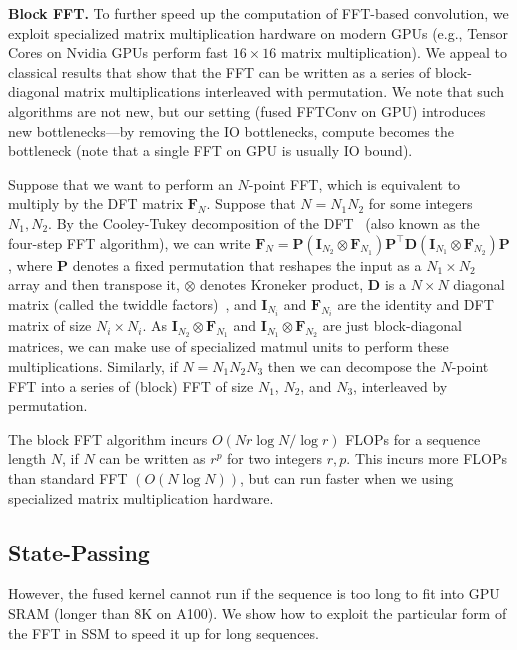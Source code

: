 \textbf{Block FFT.} To further speed up the computation of FFT-based convolution, we exploit specialized matrix multiplication hardware on modern GPUs (e.g., Tensor Cores on Nvidia GPUs perform fast $16 \times 16$ matrix multiplication). We appeal to classical results that show that the FFT can be written as a series of block-diagonal matrix multiplications interleaved with permutation. We note that such algorithms are not new, but our setting (fused FFTConv on GPU) introduces new bottlenecks---by removing the IO bottlenecks, compute becomes the bottleneck (note that a single FFT on GPU is usually IO bound).

Suppose that we want to perform an $N$-point FFT, which is equivalent to multiply by the DFT matrix $\mathbf{F}_N$.
Suppose that $N = N_1 N_2$ for some integers $N_1, N_2$. By the Cooley-Tukey decomposition of the DFT~\citep{cooley1965an,
  bailey1990ffts} (also known as the four-step FFT algorithm), we can write $\mathbf{F}_N = \mathbf{P} (\mathbf{I}_{N_2} \otimes \mathbf{F}_{N_1}) \mathbf{P}^\top \mathbf{D} (\mathbf{I}_{N_1} \otimes \mathbf{F}_{N_2}) \mathbf{P}$,
where $\mathbf{P}$ denotes a fixed permutation that reshapes the input as a $N_1 \times N_2$ array and then transpose it, $\otimes$ denotes Kroneker product, $\mathbf{D}$ is a $N \times N$ diagonal matrix (called the twiddle factors)~\citep{dao2022monarch}, and $\mathbf{I}_{N_i}$ and $\mathbf{F}_{N_i}$ are the identity and DFT matrix of size $N_i \times N_i$. As $\mathbf{I}_{N_2} \otimes \mathbf{F}_{N_1}$ and $\mathbf{I}_{N_1} \otimes \mathbf{F}_{N_2}$ are just block-diagonal matrices, we can make use of specialized matmul units to perform these multiplications. Similarly, if $N = N_1 N_2 N_3$ then we can decompose the $N$-point FFT into a series of (block) FFT of size $N_1$, $N_2$, and $N_3$, interleaved by permutation.

The block FFT algorithm incurs $O(N r \log N / \log r)$ FLOPs for a sequence length $N$, if $N$ can be written as $r^p$ for two integers $r, p$. This incurs more FLOPs than standard FFT $(O(N\log N))$, but can run faster when we using specialized matrix multiplication hardware.

\subsection{State-Passing}
However, the fused kernel cannot run if the sequence is too long to fit into GPU SRAM (longer than 8K on A100). We show how to exploit the particular form of the FFT in SSM to speed it up for long sequences.

